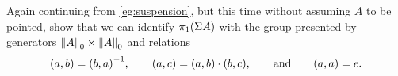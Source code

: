 \begin{ex}\label{ex:vksuspnopt}
  Again continuing from \autoref{eg:suspension}, but this time without assuming $A$ to be pointed, show that we can identify $\pi_1(\susp A)$ with the group presented by generators $\trunc0A \times \trunc0A$ and relations
  \begin{equation*}
    (a,b) = \opp{(b,a)},
    \qquad
    (a,c) = (a,b)\cdot (b,c),
    \qquad\text{and}\qquad
    (a,a) = e.
  \end{equation*}
\end{ex}


